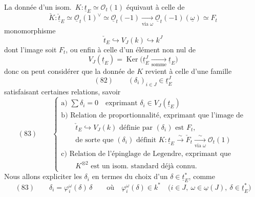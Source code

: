 \documentclass[11pt,a4paper]{article}
\begin{document}
La donnée d'un isom.\ $K : \underline{t}_E \simeq \mathcal{O}_t(1)$ équivaut à
celle de
\[
  \check K : \check{\underline{t}}_E \simeq \underline{\mathcal{O}}_t(1)^\vee \simeq
  \underline{\mathcal{O}}_t(-1) \xrightarrow[\text{via } \omega]{}
  \underline{\mathcal{O}}_t(-1)(\underline{\omega}) \simeq F_t
\]
 
monomorphisme
\[
  \check t_E \hookrightarrow V_J(k) \hookrightarrow k^J
\]
dont l'image soit $F_t$, ou enfin à celle d'un élément non nul de
\[
  V_J(\underline{t}_E) = \operatorname{Ker}\bigl(\underline{t}_E^J \xrightarrow[\text{somme}]{} \underline{t}_E\bigr)
\]
donc on peut considérer que la donnée de $K$ revient à celle d'une famille
\[
  (82) \qquad (\delta_i)_{i \in J} \in \underline{t}_E^J
\]
satisfaisant certaines relations, savoir
\[
  (83) \qquad
  \begin{cases}
    \text{a) } \sum \delta_i = 0 \quad \text{exprimant } \delta_i \in V_J(\underline{t}_E) \\
    \text{b) Relation de proportionnalité, exprimant que l'image de } \\
    \qquad \check t_E \hookrightarrow V_J(k) \text{ définie par } (\delta_i) \text{ est } F_t , \\
    \qquad \text{de sorte que } (\delta_i) \text{ définit }
      K : \underline{t}_E \xrightarrow{\sim} \check F_t \xrightarrow[\text{via } \omega]{\sim} \mathcal{O}_t(1) \\
    \text{c) Relation de l'épinglage de Legendre, exprimant que } \\
    \qquad K^{\otimes 2} \text{ est un isom.\ standard déjà connu.}
  \end{cases}
\]
Nous allons expliciter les $\delta_i$ en termes du choix d'un
$\delta \in \underline{t}_E^*$,  comme
\[
  (83) \qquad \delta_i = \varphi_i^\omega(\delta)\, \delta \qquad
  \text{où}\quad \varphi_i^\omega(\delta) \in k^* \quad
  \bigl(i \in J,\ \omega \in \underline{\omega}(J),\ \delta \in \underline{t}_E^*\bigr)
\]
\end{document}
